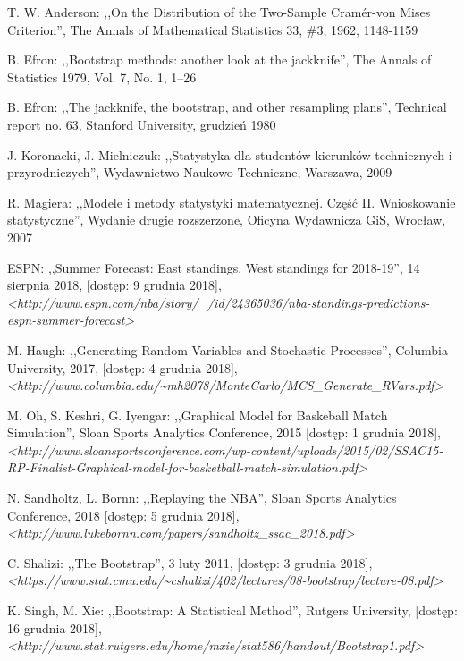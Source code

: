 \documentclass[inzynierska]{pwr_wmat_praca_dyplomowa}
\theoremstyle{plain}
\numberwithin{theorem}{chapter}
\theoremstyle{definition}
\numberwithin{theorem}{chapter}
\begin{document}
\begin{thebibliography}{9}	
	T. W. Anderson: ,,On the Distribution of the Two-Sample Cram\'er-von Mises Criterion'', The Annals of Mathematical Statistics 33, \#3, 1962, 1148-1159
	
	B. Efron: ,,Bootstrap methods: another look at the jackknife'', The Annals of Statistics 1979, Vol. 7, No. 1, 1--26 
	
	B. Efron: ,,The jackknife, the bootstrap, and other resampling plans'', Technical report no. 63, Stanford University, grudzień 1980
	
	J. Koronacki, J. Mielniczuk: ,,Statystyka dla studentów kierunków technicznych i przyrodniczych'', Wydawnictwo Naukowo-Techniczne, Warszawa, 2009
	
	R. Magiera: ,,Modele i metody statystyki matematycznej. Część II. Wnioskowanie statystyczne'', Wydanie drugie rozszerzone, Oficyna Wydawnicza GiS, Wrocław, 2007
	
	ESPN: ,,Summer Forecast: East standings, West standings for 2018-19'', 14 sierpnia 2018, [dostęp: 9 grudnia 2018], \textit{<http://www.espn.com/nba/story/\_/id/24365036/nba-standings-predictions-espn-summer-forecast>}
	
	M. Haugh: ,,Generating Random Variables and Stochastic Processes'', Columbia University, 2017, [dostęp: 4 grudnia 2018], \textit{<http://www.columbia.edu/\textasciitilde mh2078/MonteCarlo/MCS\_Generate\_RVars.pdf>}
	
	M. Oh, S. Keshri, G. Iyengar: ,,Graphical Model for Baskeball Match Simulation'', Sloan Sports Analytics Conference, 2015 [dostęp: 1 grudnia 2018], \textit{<http://www.sloansportsconference.com/wp-content/uploads/2015/02/SSAC15-RP-Finalist-Graphical-model-for-basketball-match-simulation.pdf>}
	
	N. Sandholtz, L. Bornn: ,,Replaying the NBA'', Sloan Sports Analytics Conference, 2018 [dostęp: 5 grudnia 2018], \textit{<http://www.lukebornn.com/papers/sandholtz\_ssac\_2018.pdf>}
		
	C. Shalizi: ,,The Bootstrap'', 3 luty 2011, [dostęp: 3 grudnia 2018], \textit{<https://www.stat.cmu.edu/\textasciitilde cshalizi/402/lectures/08-bootstrap/lecture-08.pdf>}
	
	K. Singh, M. Xie: ,,Bootstrap: A Statistical Method'', Rutgers University, [dostęp: 16 grudnia 2018], \textit{<http://www.stat.rutgers.edu/home/mxie/stat586/handout/Bootstrap1.pdf>}
		

\end{thebibliography}
\end{document}
